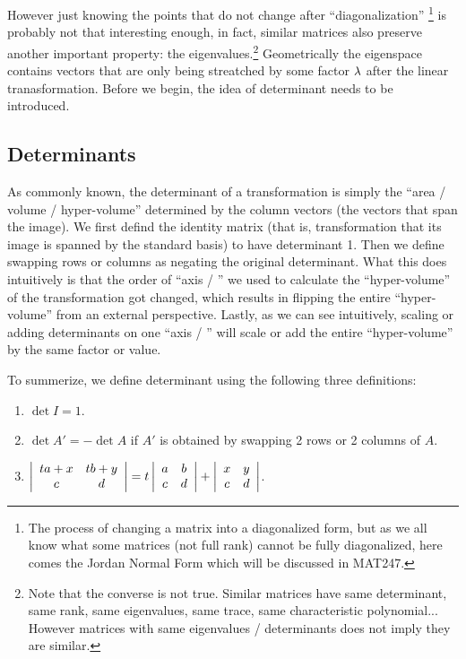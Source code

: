 \documentclass[11pt, cyan, night, 1in]{LatexTemplate/hw}
\begin{document}
However just knowing the points that do not change after ``diagonalization'' \footnote{The process of changing a matrix into a diagonalized form, but as we all know what some matrices (not full rank) cannot be fully diagonalized, here comes the Jordan Normal Form which will be discussed in MAT247.} is probably not that interesting enough, in fact, similar matrices also preserve another important property: the eigenvalues.\footnote{Note that the converse is not true. Similar matrices have same determinant, same rank, same eigenvalues, same trace, same characteristic polynomial... However matrices with same eigenvalues / determinants does not imply they are similar.} Geometrically the eigenspace contains vectors that are only being streatched by some factor $\lambda$ after the linear tranasformation. Before we begin, the idea of determinant needs to be introduced.

\subsection{Determinants}

As commonly known, the determinant of a transformation is simply the ``area / volume / hyper-volume'' determined by the column vectors (the vectors that span the image). We first defind the identity matrix (that is, transformation that its image is spanned by the standard basis) to have determinant 1. Then we define swapping rows or columns as negating the original determinant. What this does intuitively is that the order of ``axis / '' we used to calculate the ``hyper-volume'' of the transformation got changed, which results in flipping the entire ``hyper-volume'' from an external perspective. Lastly, as we can see intuitively, scaling or adding determinants on one ``axis / '' will scale or add the entire ``hyper-volume'' by the same factor or value.

To summerize, we define determinant using the following three definitions:
\begin{enumerate}
    \item $\det I = 1$.
    \item $\det A' = - \det A$ if $A'$ is obtained by swapping 2 rows or 2 columns of $A$.
    \item $\left|\begin{array}{cc}
        ta+x & tb+y\\
        c & d
    \end{array}\right| = t\left|\begin{array}{cc}
        a & b\\
        c & d
    \end{array}\right| + \left|\begin{array}{cc}
        x & y\\
        c & d
    \end{array}\right|$.
\end{enumerate}
\end{document}

